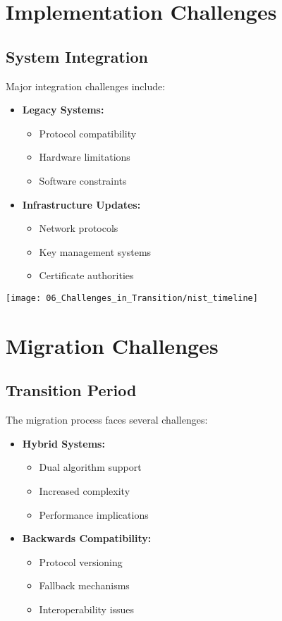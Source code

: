 \section{Implementation Challenges}\label{sec:implementation}

\subsection{System Integration}\label{subsec:integration}
Major integration challenges include:

\begin{itemize}
    \item \textbf{Legacy Systems:}
    \begin{itemize}
        \item Protocol compatibility
        \item Hardware limitations
        \item Software constraints
    \end{itemize}
    \item \textbf{Infrastructure Updates:}
    \begin{itemize}
        \item Network protocols
        \item Key management systems
        \item Certificate authorities
    \end{itemize}
\end{itemize}

\texttt{[image: 06\_Challenges\_in\_Transition/nist\_timeline]}

\section{Migration Challenges}\label{sec:migration}

\subsection{Transition Period}\label{subsec:transition}
The migration process faces several challenges:

\begin{itemize}
    \item \textbf{Hybrid Systems:}
    \begin{itemize}
        \item Dual algorithm support
        \item Increased complexity
        \item Performance implications
    \end{itemize}
    \item \textbf{Backwards Compatibility:}
    \begin{itemize}
        \item Protocol versioning
        \item Fallback mechanisms
        \item Interoperability issues
    \end{itemize}
\end{itemize}

